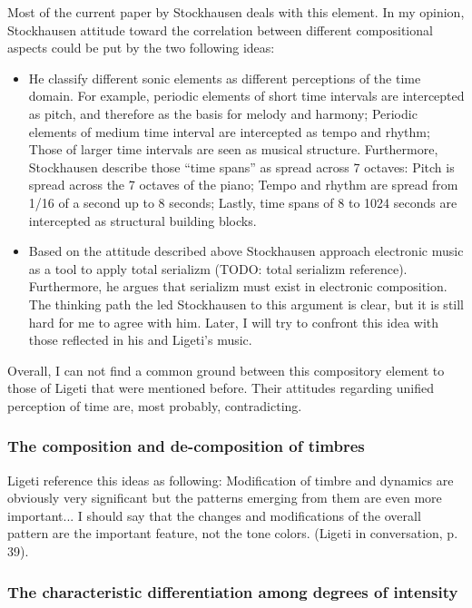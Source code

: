 \documentclass[a4paper,11pt]{article}
\begin{document}
Most of the current paper by Stockhausen deals with this element.
In my opinion, Stockhausen attitude toward the correlation between different compositional aspects could be put by the two following ideas:

\begin{itemize}
    \item He classify different sonic elements as different perceptions of the time domain.
    For example, periodic elements of short time intervals are intercepted as pitch, and therefore as the basis for melody and harmony;
    Periodic elements of medium time interval are intercepted as tempo and rhythm;
    Those of larger time intervals are seen as musical structure.
    Furthermore, Stockhausen describe those ``time spans'' as spread across 7 octaves:
    Pitch is spread across the 7 octaves of the piano;
    Tempo and rhythm are spread from 1/16 of a second up to 8 seconds;
    Lastly, time spans of 8 to 1024 seconds are intercepted as structural building blocks.

    \item Based on the attitude described above Stockhausen approach electronic music as a tool to apply total serializm (TODO: {total serializm reference}).
    Furthermore, he argues that serializm must exist in electronic composition.
    The thinking path the led Stockhausen to this argument is clear, but it is still hard for me to agree with him.
    Later, I will try to confront this idea with those reflected in his and Ligeti's music.
\end{itemize}

Overall, I can not find a common ground between this compository element to those of Ligeti that were mentioned before.
Their attitudes regarding unified perception of time are, most probably, contradicting.

\subsubsection{The composition and de-composition of timbres}
\label{subs:stockhausen:timber}

Ligeti reference this ideas as following:
Modification of timbre and dynamics are obviously very significant but the patterns emerging from them are even more important...
I should say that the changes and modifications of the overall pattern are the important feature, not the tone colors. (Ligeti in conversation, p. 39).

\subsubsection{The characteristic differentiation among degrees of intensity}
\label{subs:stockhausen:intensity}
\end{document}
